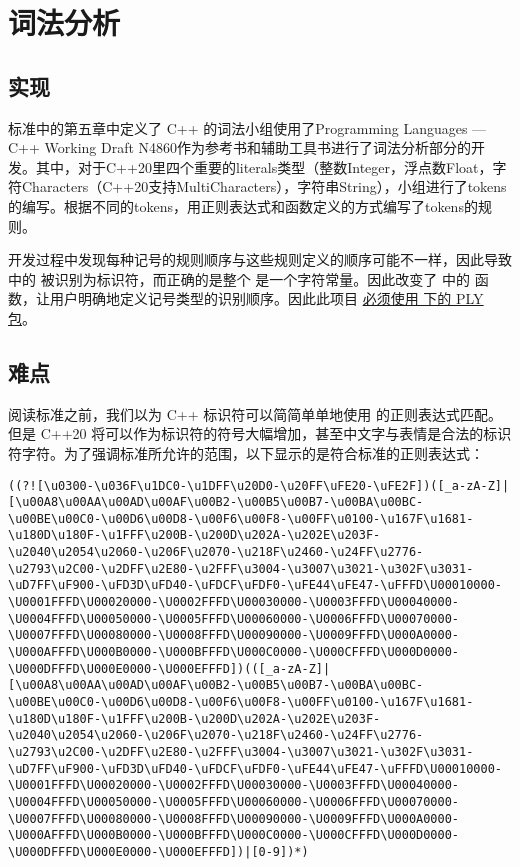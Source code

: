 \section{词法分析}

\subsection{实现}

标准中的第五章中定义了 C++ 的词法小组使用了Programming Languages — C++ Working Draft N4860作为参考书和辅助工具书进行了词法分析部分的开发。其中，对于C++20里四个重要的literals类型（整数Integer，浮点数Float，字符Characters（C++20支持MultiCharacters），字符串String），小组进行了tokens的编写。根据不同的tokens，用正则表达式和函数定义的方式编写了tokens的规则。

开发过程中发现每种记号的规则顺序与这些规则定义的顺序可能不一样，因此导致  中的  被识别为标识符，而正确的是整个  是一个字符常量。因此改变了  中的  函数，让用户明确地定义记号类型的识别顺序。因此此项目 \underline{必须使用  下的 PLY 包}。

\subsection{难点}

阅读标准之前，我们以为 C++ 标识符可以简简单单地使用 \code{[_a-zA-Z][_a-zA-Z0-9]*} 的正则表达式匹配。但是 C++20 将可以作为标识符的符号大幅增加，甚至中文字与表情是合法的标识符字符。为了强调标准所允许的范围，以下显示的是符合标准的正则表达式：

\begin{lstlisting}[basicstyle=\ttfamily\tiny]
((?![\u0300-\u036F\u1DC0-\u1DFF\u20D0-\u20FF\uFE20-\uFE2F])([_a-zA-Z]|[\u00A8\u00AA\u00AD\u00AF\u00B2-\u00B5\u00B7-\u00BA\u00BC-\u00BE\u00C0-\u00D6\u00D8-\u00F6\u00F8-\u00FF\u0100-\u167F\u1681-\u180D\u180F-\u1FFF\u200B-\u200D\u202A-\u202E\u203F-\u2040\u2054\u2060-\u206F\u2070-\u218F\u2460-\u24FF\u2776-\u2793\u2C00-\u2DFF\u2E80-\u2FFF\u3004-\u3007\u3021-\u302F\u3031-\uD7FF\uF900-\uFD3D\uFD40-\uFDCF\uFDF0-\uFE44\uFE47-\uFFFD\U00010000-\U0001FFFD\U00020000-\U0002FFFD\U00030000-\U0003FFFD\U00040000-\U0004FFFD\U00050000-\U0005FFFD\U00060000-\U0006FFFD\U00070000-\U0007FFFD\U00080000-\U0008FFFD\U00090000-\U0009FFFD\U000A0000-\U000AFFFD\U000B0000-\U000BFFFD\U000C0000-\U000CFFFD\U000D0000-\U000DFFFD\U000E0000-\U000EFFFD])(([_a-zA-Z]|[\u00A8\u00AA\u00AD\u00AF\u00B2-\u00B5\u00B7-\u00BA\u00BC-\u00BE\u00C0-\u00D6\u00D8-\u00F6\u00F8-\u00FF\u0100-\u167F\u1681-\u180D\u180F-\u1FFF\u200B-\u200D\u202A-\u202E\u203F-\u2040\u2054\u2060-\u206F\u2070-\u218F\u2460-\u24FF\u2776-\u2793\u2C00-\u2DFF\u2E80-\u2FFF\u3004-\u3007\u3021-\u302F\u3031-\uD7FF\uF900-\uFD3D\uFD40-\uFDCF\uFDF0-\uFE44\uFE47-\uFFFD\U00010000-\U0001FFFD\U00020000-\U0002FFFD\U00030000-\U0003FFFD\U00040000-\U0004FFFD\U00050000-\U0005FFFD\U00060000-\U0006FFFD\U00070000-\U0007FFFD\U00080000-\U0008FFFD\U00090000-\U0009FFFD\U000A0000-\U000AFFFD\U000B0000-\U000BFFFD\U000C0000-\U000CFFFD\U000D0000-\U000DFFFD\U000E0000-\U000EFFFD])|[0-9])*)
\end{lstlisting}

